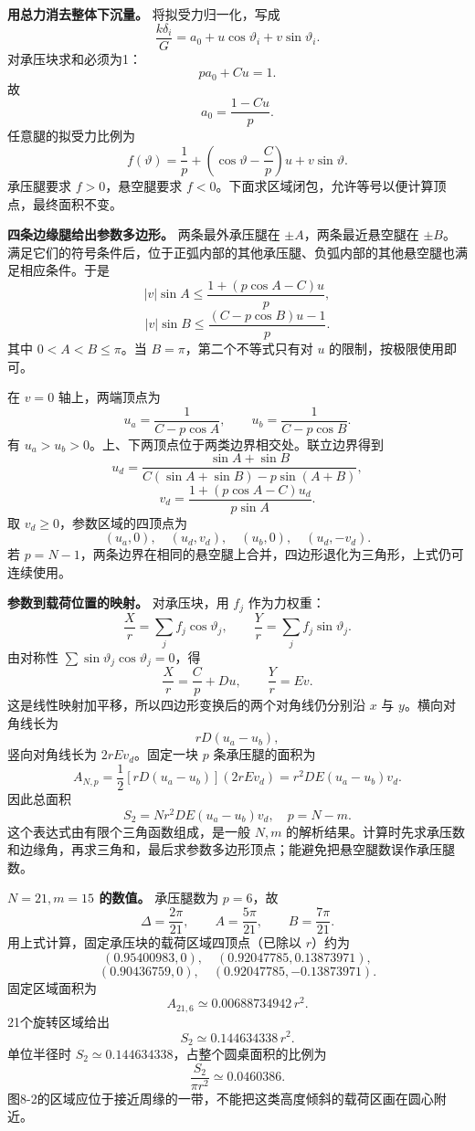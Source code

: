\documentclass[12pt,a4paper,UTF8]{ctexart}
\begin{document}
\textbf{用总力消去整体下沉量。} 将拟受力归一化，写成 \[
\frac{k\delta_i}{G}=a_0+u\cos\vartheta_i+v\sin\vartheta_i.
\] 对承压块求和必须为1： \[
pa_0+Cu=1.
\] 故 \[
a_0=\frac{1-Cu}{p}.
\] 任意腿的拟受力比例为 \[
\boxed{f(\vartheta)=\frac1p+
\left(\cos\vartheta-\frac Cp\right)u+v\sin\vartheta}.
\] 承压腿要求 \(f>0\)，悬空腿要求
\(f<0\)。下面求区域闭包，允许等号以便计算顶点，最终面积不变。

\textbf{四条边缘腿给出参数多边形。} 两条最外承压腿在
\(\pm A\)，两条最近悬空腿在
\(\pm B\)。满足它们的符号条件后，位于正弧内部的其他承压腿、负弧内部的其他悬空腿也满足相应条件。于是
\[
|v|\sin A\le\frac{1+(p\cos A-C)u}{p},
\] \[
|v|\sin B\le\frac{(C-p\cos B)u-1}{p}.
\] 其中 \(0<A<B\le\pi\)。当 \(B=\pi\)，第二个不等式只有对 \(u\)
的限制，按极限使用即可。

在 \(v=0\) 轴上，两端顶点为 \[
\boxed{u_a=\frac1{C-p\cos A}},
\qquad
\boxed{u_b=\frac1{C-p\cos B}}.
\] 有 \(u_a>u_b>0\)。上、下两顶点位于两类边界相交处。联立边界得到 \[
\boxed{u_d=
\frac{\sin A+\sin B}
{C(\sin A+\sin B)-p\sin(A+B)}},
\] \[
\boxed{v_d=
\frac{1+(p\cos A-C)u_d}{p\sin A}}.
\] 取 \(v_d\ge0\)，参数区域的四顶点为 \[
(u_a,0),\quad(u_d,v_d),\quad(u_b,0),\quad(u_d,-v_d).
\] 若
\(p=N-1\)，两条边界在相同的悬空腿上合并，四边形退化为三角形，上式仍可连续使用。

\textbf{参数到载荷位置的映射。} 对承压块，用 \(f_j\) 作为力权重： \[
\frac Xr=\sum_j f_j\cos\vartheta_j,
\qquad
\frac Yr=\sum_j f_j\sin\vartheta_j.
\] 由对称性 \(\sum\sin\vartheta_j\cos\vartheta_j=0\)，得 \[
\boxed{\frac Xr=\frac Cp+Du},
\qquad
\boxed{\frac Yr=Ev}.
\] 这是线性映射加平移，所以四边形变换后的两个对角线仍分别沿 \(x\) 与
\(y\)。横向对角线长为 \[
rD(u_a-u_b),
\] 竖向对角线长为 \(2rEv_d\)。固定一块 \(p\) 条承压腿的面积为 \[
A_{N,p}=\frac12[rD(u_a-u_b)](2rEv_d)
=r^2DE(u_a-u_b)v_d.
\] 因此总面积 \[
\boxed{S_2=N r^2DE(u_a-u_b)v_d,\quad p=N-m}.
\] 这个表达式由有限个三角函数组成，是一般 \(N,m\)
的解析结果。计算时先求承压数和边缘角，再求三角和，最后求参数多边形顶点；能避免把悬空腿数误作承压腿数。

\textbf{\(N=21,m=15\) 的数值。} 承压腿数为 \(p=6\)，故 \[
\Delta=\frac{2\pi}{21},\qquad A=\frac{5\pi}{21},\qquad B=\frac{7\pi}{21}.
\] 用上式计算，固定承压块的载荷区域四顶点（已除以 \(r\)）约为 \[
(0.95400983,0),\quad
(0.92047785,0.13873971),
\] \[
(0.90436759,0),\quad
(0.92047785,-0.13873971).
\] 固定区域面积为 \[
A_{21,6}\simeq0.00688734942\,r^2.
\] 21个旋转区域给出 \[
\boxed{S_2\simeq0.144634338\,r^2}.
\] 单位半径时 \(S_2\simeq0.144634338\)，占整个圆桌面积的比例为 \[
\boxed{\frac{S_2}{\pi r^2}\simeq0.0460386}.
\]
图8-2的区域应位于接近周缘的一带，不能把这类高度倾斜的载荷区画在圆心附近。
\end{document}
